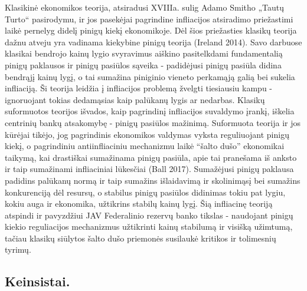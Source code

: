 \documentclass[
]{article}
\begin{document}
Klasikinė ekonomikos teorija, atsiradusi XVIIIa. sulig Adamo Smitho
„Tautų Turto`` pasirodymu, ir jos pasekėjai pagrindine infliacijos
atsiradimo priežastimi laikė pernelyg didelį pinigų kiekį ekonomikoje.
Dėl šios priežasties klasikų teorija dažnu atveju yra vadinama kiekybine
pinigų teorija (Ireland 2014). Savo darbuose klasikai bendrojo kainų
lygio svyravimus aiškino pasitelkdami fundamentalią pinigų paklausos ir
pinigų pasiūlos sąveika - padidėjusi pinigų pasiūla didina bendrąjį
kainų lygį, o tai sumažina piniginio vieneto perkamąją galią bei sukelia
infliaciją. Ši teorija leidžia į infliacijos problemą žvelgti tiesiausiu
kampu - ignoruojant tokias dedamąsias kaip palūkanų lygis ar nedarbas.
Klasikų suformuotos teorijos išvados, kaip pagrindinį infliacijos
suvaldymo įrankį, iškelia centrinių bankų atsakomybę - pinigų pasiūlos
mažinimą. Suformuota teorija ir jos kūrėjai tikėjo, jog pagrindinis
ekonomikos valdymas vyksta reguliuojant pinigų kiekį, o pagrindiniu
antiinfliaciniu mechanizmu laikė ``šalto dušo'' ekonomikai taikymą, kai
drastiškai sumažinama pinigų pasiūla, apie tai pranešama iš anksto ir
taip sumažinami infliaciniai lūkesčiai (Ball 2017). Sumažėjusi pinigų
paklausa padidins palūkanų normą ir taip sumažins išlaidavimą ir
skolinimąsį bei sumažins konkurenciją dėl resursų, o stabilus pinigų
pasiūlos didinimas tokiu pat lygiu, kokiu auga ir ekonomika, užtikrins
stabilų kainų lygį. Šią infliacinę teoriją atspindi ir pavyzdžiui JAV
Federalinio rezervų banko tikslas - naudojant pinigų kiekio reguliacijos
mechanizmus užtikrinti kainų stabilumą ir visišką užimtumą, tačiau
klasikų siūlytos šalto dušo priemonės susilaukė kritikos ir tolimesnių
tyrimų.

\hypertarget{keinsistai.}{%
\subsection{Keinsistai.}\label{keinsistai.}}
\end{document}
